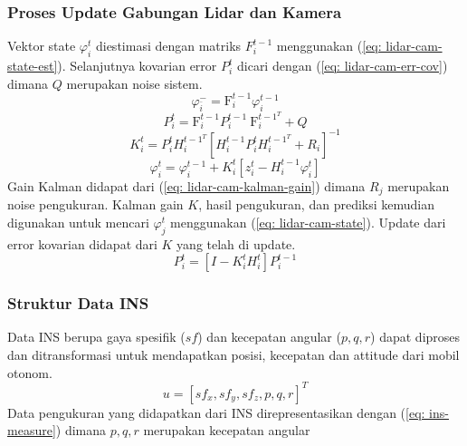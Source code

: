 \begin{frame}
    \frametitle{Proses Update Gabungan Lidar dan Kamera}

    Vektor state $\varphi_{i}^{t}$ diestimasi dengan matriks $F_{i}^{t-1}$ menggunakan (\ref{eq: lidar-cam-state-est}). Selanjutnya kovarian error $P_{i}^{t}$ dicari dengan (\ref{eq: lidar-cam-err-cov}) dimana $Q$ merupakan noise sistem.
        \begin{equation}
            \varphi_{\bar{i}}^{-}=\mathrm{F}_{i}^{t-1} \varphi_{i}^{t-1}
            \label{eq: lidar-cam-state-est}
        \end{equation}
        \begin{equation}
            P_{i}^{t}=\mathrm{F}_{i}^{t-1} P_{i}^{t-1} \mathrm{~F}_{i}^{t-1^{T}}+Q
            \label{eq: lidar-cam-err-cov}
        \end{equation}
        \begin{equation}
            K_{i}^{t}=P_{i}^{t} H_{i}^{t-1^{T}}\left[H_{i}^{t-1} P_{i}^{t} H_{i}^{t-1^{T}}+R_{i}\right]^{-1}
            \label{eq: lidar-cam-kalman-gain}
        \end{equation}
        \begin{equation}
            \varphi_{i}^{t}=\varphi_{i}^{t-1}+K_{i}^{t}\left[z_{i}^{t}-H_{i}^{t-1} \varphi_{i}^{t}\right]
            \label{eq: lidar-cam-state}
        \end{equation}
        Gain Kalman didapat dari (\ref{eq: lidar-cam-kalman-gain}) dimana $R_j$ merupakan noise pengukuran. Kalman gain $K$, hasil pengukuran, dan prediksi kemudian digunakan untuk mencari $\varphi_{j}^{t}$ menggunakan (\ref{eq: lidar-cam-state}). Update dari error kovarian didapat dari $K$ yang telah di update.
        \begin{equation}
            P_{i}^{t}=\left[I-K_{i}^{t} H_{i}^{t}\right] P_{i}^{t-1}
        \end{equation}
\end{frame}


\begin{frame}
    \frametitle{Struktur Data INS}

    Data INS berupa gaya spesifik ($sf$) dan kecepatan angular ($p, q, r$) dapat diproses dan ditransformasi untuk mendapatkan posisi, kecepatan dan attitude dari mobil otonom.
    \begin{equation}
        u=\left[s f_{x}, s f_{y}, s f_{z}, p, q, r\right]^{T}
        \label{eq: ins-measure}
    \end{equation}
    Data pengukuran yang didapatkan dari INS direpresentasikan dengan (\ref{eq: ins-measure}) dimana $p, q, r$ merupakan kecepatan angular  
\end{frame}


